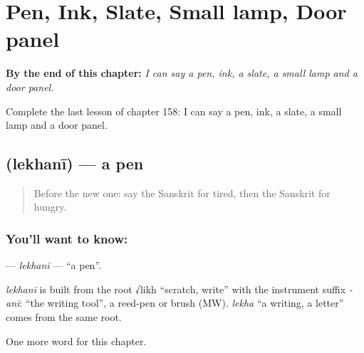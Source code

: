 
\chapter{Pen, Ink, Slate, Small lamp, Door panel}
\label{ch:sa-pen-ink-slate-small-lamp-door-panel}

\begin{chapteropening}
\textbf{By the end of this chapter:} \emph{I can say a pen, ink, a slate, a small lamp and a door panel.}

Complete the last lesson of chapter 158: I can say a pen, ink, a slate, a small lamp and a door panel.
\end{chapteropening}

\section[\texorpdfstring{\sk{लेखनी} (lekhanī)}{लेखनी (lekhanī)}]{ (lekhanī) — a pen}

\label{lesson:SA-C158-lekhani}



\begin{quote}
Before the new one: say the Sanskrit for tired, then the Sanskrit for hungry.
\end{quote}

\subsection*{You'll want to know: }
\textbf{} — \emph{lekhanī} — \textquotedblleft{}a pen\textquotedblright{}.

\begin{cousinweb}
\emph{lekhanī} is built from the root √likh \textquotedblleft{}scratch, write\textquotedblright{} with the instrument suffix \emph{-anī}: \textquotedblleft{}the writing tool\textquotedblright{}, a reed-pen or brush (MW). \emph{lekha} \textquotedblleft{}a writing, a letter\textquotedblright{} comes from the same root.
\end{cousinweb}

\begin{grammarlens}[title={What you've built}]
One more word for this chapter.
\end{grammarlens}


